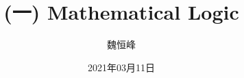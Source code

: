 \documentclass[]{beamer}
\title[(一) Mathematical Logic]{(一) Mathematical Logic}
\author[魏恒峰]{\large 魏恒峰}
\institute{hfwei@nju.edu.cn}
\date{2021年03月11日}
\begin{document}
\maketitle





\thankyou{}

\end{document}
